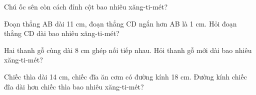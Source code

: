 \begin{ex} %
Chú ốc sên còn cách đỉnh cột bao nhiêu xăng-ti-mét?
\end{ex}

\begin{ex} %
Đoạn thẳng AB dài 11 cm, đoạn thẳng CD ngắn hơn AB là 1 cm. Hỏi đoạn thẳng CD dài bao nhiêu xăng-ti-mét?
\end{ex}

\begin{ex} %
Hai thanh gỗ cùng dài 8 cm ghép nối tiếp nhau. Hỏi thanh gỗ mới dài bao nhiêu xăng-ti-mét?
\end{ex}

\begin{ex} %
Chiếc thìa dài 14 cm, chiếc đĩa ăn cơm có đường kính 18 cm. Đường kính chiếc đĩa dài hơn chiếc thìa bao nhiêu xăng-ti-mét?
\end{ex}
